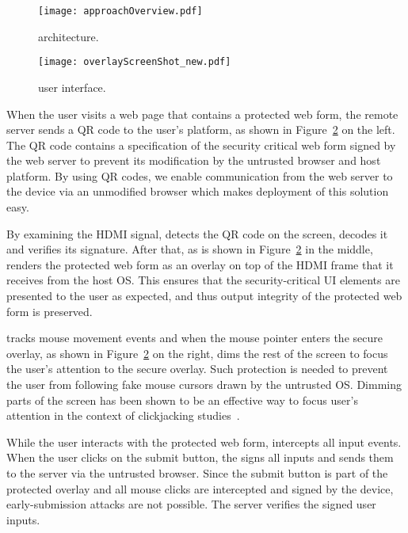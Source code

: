 \begin{figure}[t]
	\centering
	\texttt{[image: approachOverview.pdf]}
	\caption{\protection architecture.}
	\label{fig:architecture}
\end{figure}

\begin{figure}[t]
	\centering
	\texttt{[image: overlayScreenShot\_new.pdf]}
	\caption{\protection user interface.}
	\label{fig:screenshot}
\end{figure}

When the user visits a web page that contains a protected web form, the remote server sends a QR code to the user's platform, as shown in Figure~\ref{fig:screenshot} on the left. The QR code contains a specification of the security critical web form signed by the web server to prevent its modification by the untrusted browser and host platform. By using QR codes, we enable communication from the web server to the \hub device via an unmodified browser which makes deployment of this solution easy.

By examining the HDMI signal, \hub detects the QR code on the screen, decodes it and verifies its signature. After that, as is shown in Figure~\ref{fig:screenshot} in the middle, \hub renders the protected web form as an overlay on top of the HDMI frame that it receives from the host OS. This ensures that the security-critical UI elements are presented to the user as expected, and thus output integrity of the protected web form is preserved.

\hub tracks mouse movement events and when the mouse pointer enters the secure overlay, as shown in Figure~\ref{fig:screenshot} on the right, \hub dims the rest of the screen to focus the user's attention to the secure overlay. Such protection is needed to prevent the user from following fake mouse cursors drawn by the untrusted OS. Dimming parts of the screen has been shown to be an effective way to focus user's attention in the context of clickjacking studies~\cite{huang2012clickjacking}.

While the user interacts with the protected web form, \hub intercepts all input events. When the user clicks on the submit button, the \hub signs all inputs and sends them to the server via the untrusted browser. Since the submit button is part of the protected overlay and all mouse clicks are intercepted and signed by the \hub device, early-submission attacks are not possible. The server verifies the signed user inputs. 


